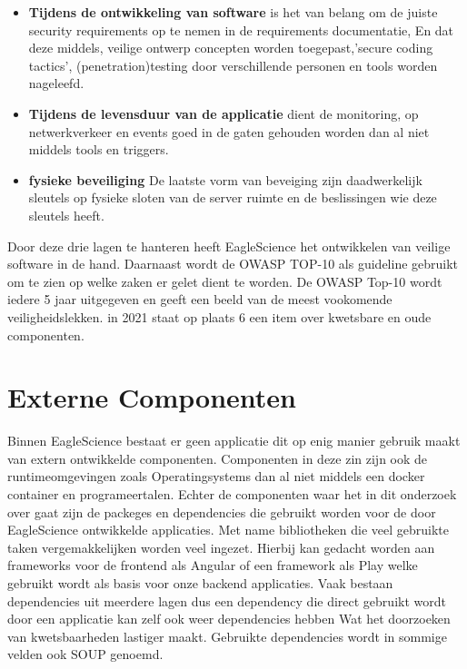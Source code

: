 \begin{itemize}
    \item \textbf{Tijdens de ontwikkeling van software} is het van belang om de juiste security requirements op te nemen in de requirements documentatie, En dat deze middels, veilige ontwerp concepten worden toegepast,'secure coding tactics', (penetration)testing door verschillende personen en tools worden nageleefd.
    \item \textbf{Tijdens de levensduur van de applicatie} dient de monitoring, op netwerkverkeer en events goed in de gaten gehouden worden dan al niet middels tools en triggers.
    \item \textbf{fysieke beveiliging} De laatste vorm van beveiging zijn daadwerkelijk sleutels op fysieke sloten van de server ruimte en de beslissingen wie deze sleutels heeft.
\end{itemize}
Door deze drie lagen te hanteren heeft EagleScience het ontwikkelen van veilige software in de hand. Daarnaast wordt de OWASP TOP-10 als guideline gebruikt om te zien op welke zaken er gelet dient te worden. De OWASP Top-10 wordt iedere 5 jaar uitgegeven en geeft een beeld van de meest vookomende veiligheidslekken. in 2021 staat op plaats 6 een item over kwetsbare en oude componenten. \cite{Kohnfelder2021}


\section{Externe Componenten}\label{sec:software-of-unkown-provenance}
Binnen EagleScience bestaat er geen applicatie dit op enig manier gebruik maakt van extern ontwikkelde componenten. Componenten in deze zin zijn ook de runtime\-omgevingen zoals Operatingsystems dan al niet middels een docker container en programeertalen. Echter de componenten waar het in dit onderzoek over gaat zijn de packeges en dependencies die gebruikt worden voor de door EagleScience ontwikkelde applicaties. Met name bibliotheken die veel gebruikte taken vergemakkelijken worden veel ingezet. Hierbij kan gedacht worden aan frameworks voor de frontend als Angular of een framework als Play welke gebruikt wordt als basis voor onze backend applicaties. Vaak bestaan dependencies uit meerdere lagen dus een dependency die direct gebruikt wordt door een applicatie kan zelf ook weer dependencies hebben Wat het doorzoeken van kwetsbaarheden lastiger maakt. Gebruikte dependencies wordt in sommige velden ook SOUP genoemd.

